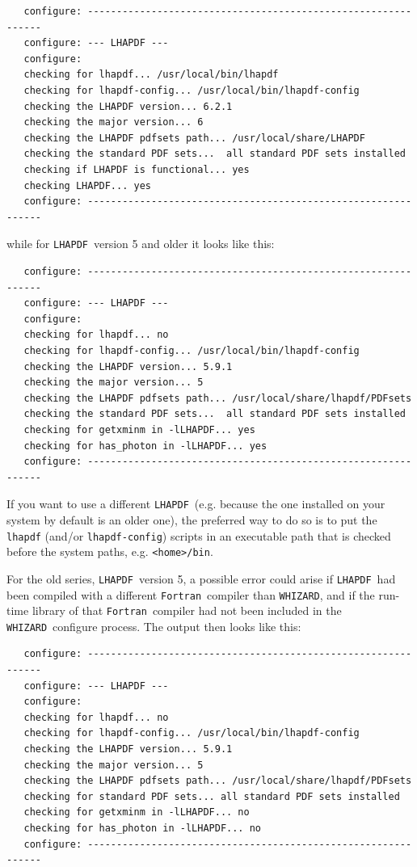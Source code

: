 \documentclass[12pt]{book}
\newcommand{\ttt}[1]{\texttt{#1}}
\newcommand{\whizard}{\ttt{WHIZARD}}
\newcommand{\lhapdf}{\ttt{LHAPDF}}
\newcommand{\fortran}{\ttt{Fortran}}
\begin{document}
\begin{footnotesize}
\begin{verbatim}
   configure: --------------------------------------------------------------
   configure: --- LHAPDF ---
   configure:
   checking for lhapdf... /usr/local/bin/lhapdf
   checking for lhapdf-config... /usr/local/bin/lhapdf-config
   checking the LHAPDF version... 6.2.1
   checking the major version... 6
   checking the LHAPDF pdfsets path... /usr/local/share/LHAPDF
   checking the standard PDF sets...  all standard PDF sets installed
   checking if LHAPDF is functional... yes
   checking LHAPDF... yes
   configure: --------------------------------------------------------------
\end{verbatim}
\end{footnotesize}
while for \lhapdf\ version 5 and older it looks like this:

\begin{footnotesize}
\begin{verbatim}
   configure: --------------------------------------------------------------
   configure: --- LHAPDF ---
   configure:
   checking for lhapdf... no
   checking for lhapdf-config... /usr/local/bin/lhapdf-config
   checking the LHAPDF version... 5.9.1
   checking the major version... 5
   checking the LHAPDF pdfsets path... /usr/local/share/lhapdf/PDFsets
   checking the standard PDF sets...  all standard PDF sets installed
   checking for getxminm in -lLHAPDF... yes
   checking for has_photon in -lLHAPDF... yes
   configure: --------------------------------------------------------------
\end{verbatim}
\end{footnotesize}

If you want to use a different \lhapdf\ (e.g. because the one installed
on your system by default is an older one), the preferred way to do so
is to put the \ttt{lhapdf} (and/or \ttt{lhapdf-config}) scripts in an
executable path that is checked before the system paths,
e.g. \ttt{<home>/bin}.

For the old series, \lhapdf\ version 5, a possible error could arise
if \lhapdf\ had been compiled with a different \fortran\ compiler than
\whizard, and if the run-time library of that \fortran\ compiler had
not been included in the \whizard\ configure process. The output then
looks like this:

\begin{footnotesize}
\begin{verbatim}
   configure: --------------------------------------------------------------
   configure: --- LHAPDF ---
   configure:
   checking for lhapdf... no
   checking for lhapdf-config... /usr/local/bin/lhapdf-config
   checking the LHAPDF version... 5.9.1
   checking the major version... 5
   checking the LHAPDF pdfsets path... /usr/local/share/lhapdf/PDFsets
   checking for standard PDF sets... all standard PDF sets installed
   checking for getxminm in -lLHAPDF... no
   checking for has_photon in -lLHAPDF... no
   configure: --------------------------------------------------------------
\end{verbatim}
\end{footnotesize}
\end{document}
